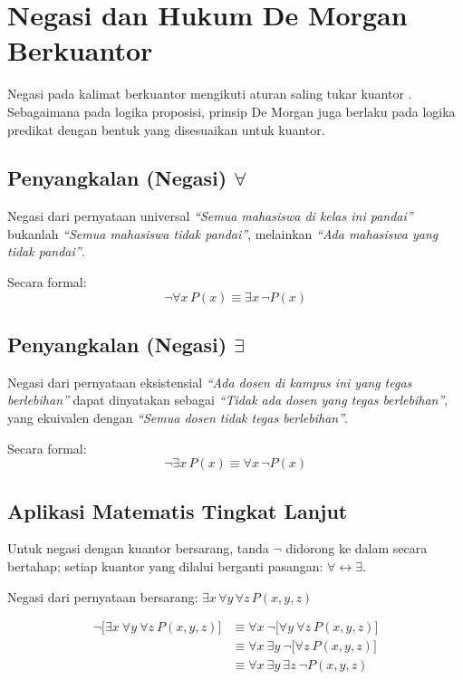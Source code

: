 \section{Negasi dan Hukum De Morgan Berkuantor}

Negasi pada kalimat berkuantor mengikuti aturan saling tukar kuantor \cite{rosen2019}. Sebagaimana pada logika proposisi, prinsip De Morgan juga berlaku pada logika predikat dengan bentuk yang disesuaikan untuk kuantor.

\subsection{Penyangkalan (Negasi) $\forall$}
Negasi dari pernyataan universal \textit{``Semua mahasiswa di kelas ini pandai''} bukanlah \textit{``Semua mahasiswa tidak pandai''}, melainkan \textit{``Ada mahasiswa yang tidak pandai''}.

Secara formal:
\[ \neg \forall x \, P(x) \equiv \exists x \, \neg P(x) \]

\subsection{Penyangkalan (Negasi) $\exists$}
Negasi dari pernyataan eksistensial \textit{``Ada dosen di kampus ini yang tegas berlebihan''} dapat dinyatakan sebagai \textit{``Tidak ada dosen yang tegas berlebihan''}, yang ekuivalen dengan \textit{``Semua dosen tidak tegas berlebihan''}.

Secara formal:
\[ \neg \exists x \, P(x) \equiv \forall x \, \neg P(x) \]

\subsection{Aplikasi Matematis Tingkat Lanjut}

Untuk negasi dengan kuantor bersarang, tanda $\neg$ didorong ke dalam secara bertahap; setiap kuantor yang dilalui berganti pasangan: $\forall \leftrightarrow \exists$.

\begin{contoh}
Negasi dari pernyataan bersarang: $\exists x \, \forall y \, \forall z \, P(x,y,z)$

\begin{align*}
    \neg \Big[ \exists x \ \forall y \ \forall z \ P(x,y,z) \Big] 
    &\equiv \forall x \ \neg \Big[ \forall y \ \forall z \ P(x,y,z) \Big] \\
    &\equiv \forall x \ \exists y \ \neg \Big[ \forall z \ P(x,y,z) \Big] \\
    &\equiv \forall x \ \exists y \ \exists z \ \neg P(x,y,z)
\end{align*}
\end{contoh}

